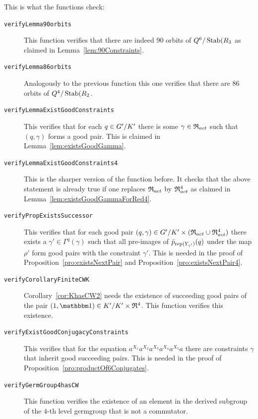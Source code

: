 \documentclass[a4paper,11pt]{amsart}
\begin{document}
This is what the functions check:
\begin{description}
\item[\texttt{verifyLemma90orbits}] This function verifies that there are
  indeed $90$ orbits of ${Q^6/\operatorname{Stab}(R_3}$ as claimed in Lemma~\ref{lem:90Constraints}. 
\item[\texttt{verifyLemma86orbits}] Analogously to the previous function 
  this one verifies that there are $86$ orbits of ${Q^4/\operatorname{Stab}(R_2}$. 
\item[\texttt{verifyLemmaExistGoodConstraints}] This verifies that for each 
  $q\in{G'/K'}$ there is some $\gamma\in\mathfrak{R}_{act}$ such that $(q,\gamma)$ 
  forms a good pair. This is claimed in Lemma~\ref{lem:existsGoodGamma}.
\item[\texttt{verifyLemmaExistGoodConstraints4}] This is the sharper version
  of the function before. It checks that the above statement is already true 
  if one replaces $\mathfrak{R}_{act}$ by $\mathfrak{R}_{act}^4$ as claimed in 
  Lemma~\ref{lem:existsGoodGammaForRed4}.
\item[\texttt{verifyPropExistsSuccessor}] This verifies that for
  each good pair $(q,\gamma) \in{G'/K'}\times(\mathfrak{R}_{act}\cup \mathfrak{R}_{act}^4)$ there exists 
  a $\gamma'\in\Gamma^q(\gamma)$ such that all pre-images of 
  $\bar p_{\textup{rep}(Y_{\gamma'})}(q)$ under the map $\rho'$ form
  good pairs with the constraint $\gamma'$. This is needed in the proof of
  Proposition~\ref{pro:existsNextPair} and Proposition~\ref{pro:existsNextPair4}.
\item[\texttt{verifyCorollaryFiniteCWK}] Corollary~\ref{cor:KhasCW2} needs the
  existence of succeeding good pairs of the pair $(1,\id)\in\RNK{K'}{K'}\times\Red^4$.
  This function verifies this existence. 
\item[\texttt{verifyExistGoodConjugacyConstraints}] This verifies that for the equation
  $a^{X_1}a^{X_2}a^{X_3}a^{X_4}a^{X_5}a$ there are constraints $\gamma$ 
  that inherit good succeeding pairs. This is needed in the proof of
  Proposition~\ref{pro:productOf6Conjugates}.
\item[\texttt{verifyGermGroup4hasCW}] This function verifies the existence of 
  an element in the derived subgroup of the $4$-th level germgroup that is not a commutator.
\end{description}
\end{document}
